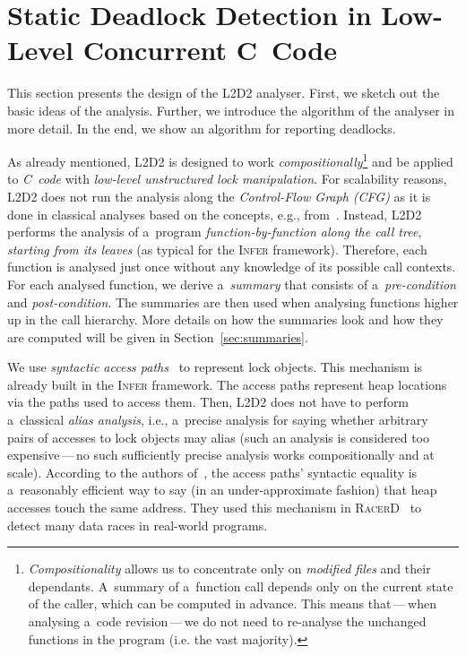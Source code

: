 \documentclass[runningheads]{llncs}
\begin{document}
\section{Static Deadlock Detection in Low-Level Concurrent C~Code}
\label{sec:l2d2}

This section presents the design of the \textsc{L2D2} analyser. First, we
sketch out the basic ideas of the analysis. Further, we introduce the
algorithm of the analyser in more detail. In the end, we show an algorithm
for reporting deadlocks.

As already mentioned, \textsc{L2D2} is designed to work
\emph{compositionally}\footnote{\emph{Compositionality} allows us to
concentrate only on \emph{modified files} and their dependants. A~summary of
a~function call depends only on the current state of the caller, which can
be computed in advance. This means that\,---\,when analysing a~code
revision\,---\,we do not need to re-analyse the unchanged functions in the
program (i.e. the vast majority).} and be applied to \emph{C~code} with
\emph{low-level unstructured lock manipulation}. For scalability reasons,
\textsc{L2D2} does not run the analysis along the \emph{Control-Flow Graph
(CFG)} as it is done in classical analyses based on the concepts, e.g.,
from~\cite{dfagr95}. Instead, \textsc{L2D2} performs the analysis of
a~program \emph{function-by-function along the call tree}, \emph{starting
from its leaves} (as typical for the \textsc{Infer} framework). Therefore,
each function is analysed just once without any knowledge of its possible
call contexts. For each analysed function, we derive a~\emph{summary}
that consists of a~\emph{pre-condition} and \emph{post-condition}. The
summaries are then used when analysing functions higher up in the call
hierarchy. More details on how the summaries look and how they are
computed will be given in Section~\ref{sec:summaries}.

We use \emph{syntactic access paths}~\cite{ap15} to represent lock objects.
This mechanism is already built in the \textsc{Infer} framework. The access
paths represent heap locations via the paths used to access them. Then,
\textsc{L2D2} does not have to perform a~classical \emph{alias analysis},
i.e., a~precise analysis for saying whether arbitrary pairs of accesses to
lock objects may alias (such an analysis is considered too
expensive\,---\,no such sufficiently precise analysis works compositionally
and at scale). According to the authors of~\cite{racerD18}, the access paths'
syntactic equality is a~reasonably efficient way to say (in an
under-approximate fashion) that heap accesses touch the same address. They
used this mechanism in \textsc{RacerD}~\cite{racerD18} to detect many data
races in real-world programs.
\end{document}
